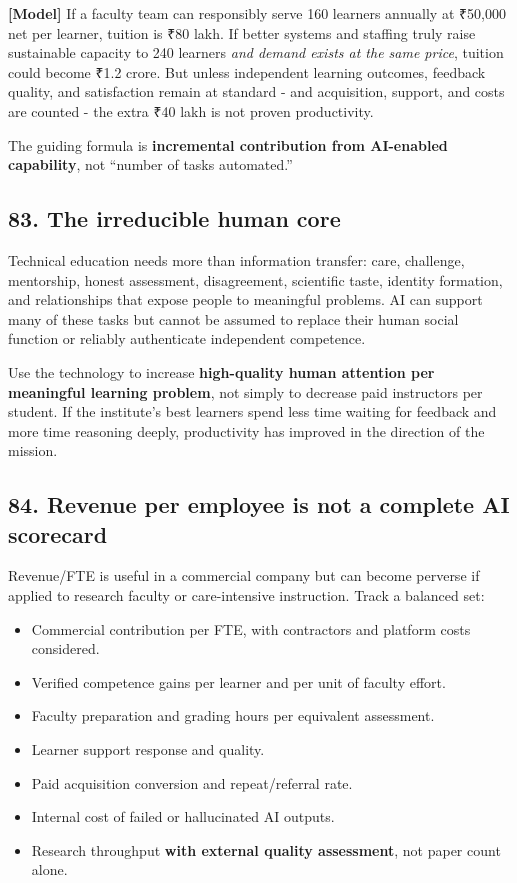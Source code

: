 \textbf{\textbf{[Model]}} If a faculty team can responsibly serve 160 learners annually at \textnormal{₹}50,000 net per learner, tuition is \textnormal{₹}80 lakh. If better systems and staffing truly raise sustainable capacity to 240 learners \textit{and demand exists at the same price}, tuition could become \textnormal{₹}1.2 crore. But unless independent learning outcomes, feedback quality, and satisfaction remain at standard - and acquisition, support, and costs are counted - the extra \textnormal{₹}40 lakh is not proven productivity.

The guiding formula is \textbf{incremental contribution from AI-enabled capability}, not ``number of tasks automated.''

\subsection{83. The irreducible human core}

Technical education needs more than information transfer: care, challenge, mentorship, honest assessment, disagreement, scientific taste, identity formation, and relationships that expose people to meaningful problems. AI can support many of these tasks but cannot be assumed to replace their human social function or reliably authenticate independent competence.

Use the technology to increase \textbf{high-quality human attention per meaningful learning problem}, not simply to decrease paid instructors per student. If the institute's best learners spend less time waiting for feedback and more time reasoning deeply, productivity has improved in the direction of the mission.

\subsection{84. Revenue per employee is not a complete AI scorecard}

Revenue/\allowbreak FTE is useful in a commercial company but can become perverse if applied to research faculty or care-intensive instruction. Track a balanced set:

\begin{itemize}[leftmargin=*,itemsep=1.5pt]
  \item Commercial contribution per FTE, with contractors and platform costs considered.
  \item Verified competence gains per learner and per unit of faculty effort.
  \item Faculty preparation and grading hours per equivalent assessment.
  \item Learner support response and quality.
  \item Paid acquisition conversion and repeat/\allowbreak referral rate.
  \item Internal cost of failed or hallucinated AI outputs.
  \item Research throughput \textbf{with external quality assessment}, not paper count alone.
\end{itemize}


